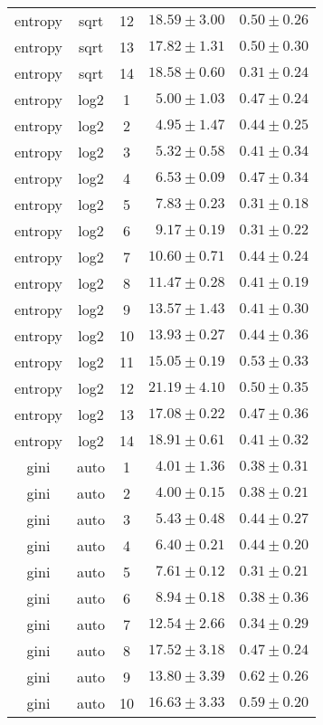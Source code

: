 \begin{tabular}{cccrr}
entropy & sqrt & 12 & $18.59 \pm 3.00$ & $0.50 \pm 0.26$\\
entropy & sqrt & 13 & $17.82 \pm 1.31$ & $0.50 \pm 0.30$\\
entropy & sqrt & 14 & $18.58 \pm 0.60$ & $0.31 \pm 0.24$\\
entropy & log2 & 1 & $5.00 \pm 1.03$ & $0.47 \pm 0.24$\\
entropy & log2 & 2 & $4.95 \pm 1.47$ & $0.44 \pm 0.25$\\
entropy & log2 & 3 & $5.32 \pm 0.58$ & $0.41 \pm 0.34$\\
entropy & log2 & 4 & $6.53 \pm 0.09$ & $0.47 \pm 0.34$\\
entropy & log2 & 5 & $7.83 \pm 0.23$ & $0.31 \pm 0.18$\\
entropy & log2 & 6 & $9.17 \pm 0.19$ & $0.31 \pm 0.22$\\
entropy & log2 & 7 & $10.60 \pm 0.71$ & $0.44 \pm 0.24$\\
entropy & log2 & 8 & $11.47 \pm 0.28$ & $0.41 \pm 0.19$\\
entropy & log2 & 9 & $13.57 \pm 1.43$ & $0.41 \pm 0.30$\\
entropy & log2 & 10 & $13.93 \pm 0.27$ & $0.44 \pm 0.36$\\
entropy & log2 & 11 & $15.05 \pm 0.19$ & $0.53 \pm 0.33$\\
entropy & log2 & 12 & $21.19 \pm 4.10$ & $0.50 \pm 0.35$\\
entropy & log2 & 13 & $17.08 \pm 0.22$ & $0.47 \pm 0.36$\\
entropy & log2 & 14 & $18.91 \pm 0.61$ & $0.41 \pm 0.32$\\
gini & auto & 1 & $4.01 \pm 1.36$ & $0.38 \pm 0.31$\\
gini & auto & 2 & $4.00 \pm 0.15$ & $0.38 \pm 0.21$\\
gini & auto & 3 & $5.43 \pm 0.48$ & $0.44 \pm 0.27$\\
gini & auto & 4 & $6.40 \pm 0.21$ & $0.44 \pm 0.20$\\
gini & auto & 5 & $7.61 \pm 0.12$ & $0.31 \pm 0.21$\\
gini & auto & 6 & $8.94 \pm 0.18$ & $0.38 \pm 0.36$\\
gini & auto & 7 & $12.54 \pm 2.66$ & $0.34 \pm 0.29$\\
gini & auto & 8 & $17.52 \pm 3.18$ & $0.47 \pm 0.24$\\
gini & auto & 9 & $13.80 \pm 3.39$ & $0.62 \pm 0.26$\\
gini & auto & 10 & $16.63 \pm 3.33$ & $0.59 \pm 0.20$\\

\end{tabular}
